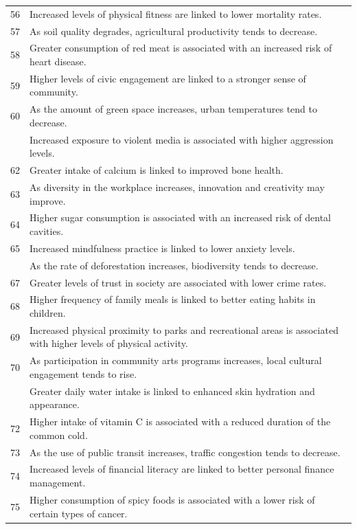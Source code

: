 \documentclass[
  letterpaper,
  DIV=11,
  numbers=noendperiod]{scrartcl}
\begin{document}
\begin{longtable}[t]{r>{\raggedright\arraybackslash}p{35em}}
56 & Increased levels of physical fitness are linked to lower mortality rates.\\
57 & As soil quality degrades, agricultural productivity tends to decrease.\\
58 & Greater consumption of red meat is associated with an increased risk of heart disease.\\
59 & Higher levels of civic engagement are linked to a stronger sense of community.\\
60 & As the amount of green space increases, urban temperatures tend to decrease.\\
\addlinespace
61 & Increased exposure to violent media is associated with higher aggression levels.\\
62 & Greater intake of calcium is linked to improved bone health.\\
63 & As diversity in the workplace increases, innovation and creativity may improve.\\
64 & Higher sugar consumption is associated with an increased risk of dental cavities.\\
65 & Increased mindfulness practice is linked to lower anxiety levels.\\
\addlinespace
66 & As the rate of deforestation increases, biodiversity tends to decrease.\\
67 & Greater levels of trust in society are associated with lower crime rates.\\
68 & Higher frequency of family meals is linked to better eating habits in children.\\
69 & Increased physical proximity to parks and recreational areas is associated with higher levels of physical activity.\\
70 & As participation in community arts programs increases, local cultural engagement tends to rise.\\
\addlinespace
71 & Greater daily water intake is linked to enhanced skin hydration and appearance.\\
72 & Higher intake of vitamin C is associated with a reduced duration of the common cold.\\
73 & As the use of public transit increases, traffic congestion tends to decrease.\\
74 & Increased levels of financial literacy are linked to better personal finance management.\\
75 & Higher consumption of spicy foods is associated with a lower risk of certain types of cancer.\\

\end{longtable}
\end{document}
